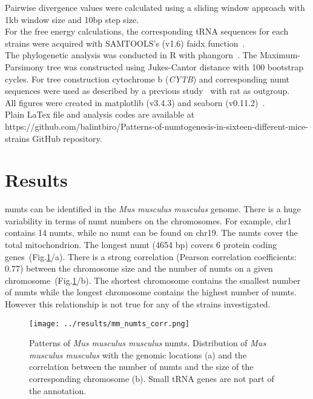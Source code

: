 \documentclass[a4paper,12pt]{article}
\numberwithin{equation}{section} %
\begin{document}
Pairwise divergence values were calculated using a sliding window approach with 1kb window size and 10bp step size.\\ \indent For the free energy calculations, the corresponding tRNA sequences for each strains were acquired with SAMTOOLS's (v1.6) faidx function~.\\ \indent The phylogenetic analysis was conducted in R with phangorn~. The Maximum-Parsimony tree was constructed using Jukes-Cantor distance with 100 bootstrap cycles. For tree construction cytochrome b (\textit{CYTB}) and corresponding numt sequences were used as described by a previous study~ with rat as outgroup.\\ \indent All figures were created in matplotlib (v3.4.3) and seaborn (v0.11.2)~. \\ \indent Plain LaTex file and analysis codes are available at https://github.com/balintbiro/Patterns-of-numtogenesis-in-sixteen-different-mice-strains GitHub repository. 

\section{Results}
 numts can be identified in the \textit{Mus musculus musculus} genome. There is a huge variability in terms of numt numbers on the chromosomes. For example, chr1 contains 14 numts, while no numt can be found on chr19. The numts cover the total mitochondrion. The longest numt (4654 bp) covers 6 protein coding genes~(Fig.\ref{fig:mm_numts_corr}/a). There is a strong correlation (Pearson correlation coefficients: 0.77) between the chromosome size and the number of numts on a given chromosome~(Fig.\ref{fig:mm_numts_corr}/b). The shortest chromosome contains the smallest number of numts while the longest chromosome contains the highest number of numts. However this relationship is not true for any of the strains investigated.
\begin{figure}[H]
    \centering
    \captionsetup{justification=centering}
    \texttt{[image: ../results/mm\_numts\_corr.png]}
    \caption{Patterns of  \textit{Mus musculus musculus} numts. Distribution of  \textit{Mus musculus musculus} with the genomic locations (a) and the correlation between the number of numts and the size of the corresponding chromosome (b). Small tRNA genes are not part of the annotation.}
    \label{fig:mm_numts_corr}
\end{figure}
\end{document}
